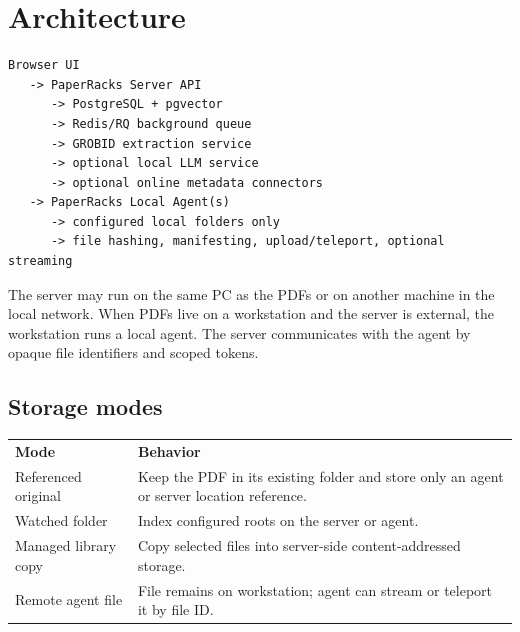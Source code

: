 \section{Architecture}

\begin{lstlisting}
Browser UI
   -> PaperRacks Server API
      -> PostgreSQL + pgvector
      -> Redis/RQ background queue
      -> GROBID extraction service
      -> optional local LLM service
      -> optional online metadata connectors
   -> PaperRacks Local Agent(s)
      -> configured local folders only
      -> file hashing, manifesting, upload/teleport, optional streaming
\end{lstlisting}

The server may run on the same PC as the PDFs or on another machine in the local network. When PDFs live on a workstation and the server is external, the workstation runs a local agent. The server communicates with the agent by opaque file identifiers and scoped tokens.

\subsection{Storage modes}

\begin{longtable}{p{}p{}}
\textbf{Mode} & \textbf{Behavior} \\
Referenced original & Keep the PDF in its existing folder and store only an agent or server location reference. \\
Watched folder & Index configured roots on the server or agent. \\
Managed library copy & Copy selected files into server-side content-addressed storage. \\
Remote agent file & File remains on workstation; agent can stream or teleport it by file ID. \\
\end{longtable}
